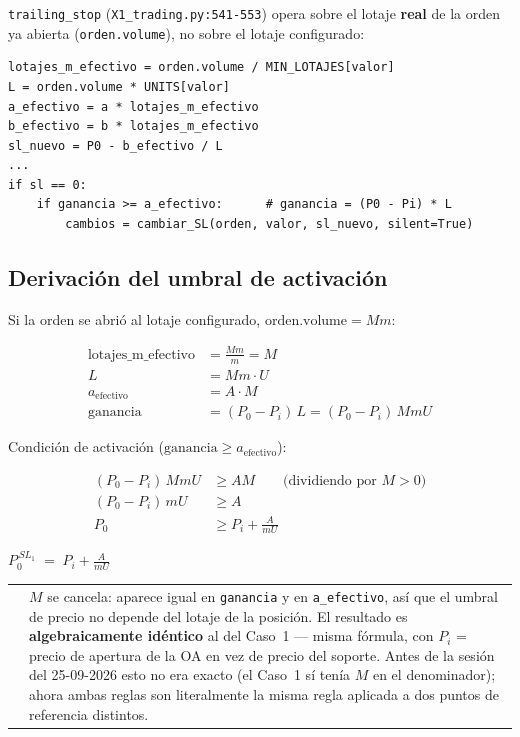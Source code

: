 \documentclass[11pt,a4paper]{article}
\makeatletter
\newcommand{\code}[1]{\texttt{\small #1}}
\newenvironment{nota}{%
  \par\medskip\noindent
  \begin{tabular}{@{}p{0.4em}@{\hspace{8pt}}p{\dimexpr\linewidth-2em\relax}@{}}
  \textcolor{cnaranja}{\rule{3pt}{1.1em}} &
}{\end{tabular}\par\medskip}
\makeatother
\begin{document}
\code{trailing\_stop} (\code{X1\_trading.py:541-553}) opera sobre el lotaje
\textbf{real} de la orden ya abierta (\code{orden.volume}), no sobre el lotaje
configurado:

\begin{lstlisting}
lotajes_m_efectivo = orden.volume / MIN_LOTAJES[valor]
L = orden.volume * UNITS[valor]
a_efectivo = a * lotajes_m_efectivo
b_efectivo = b * lotajes_m_efectivo
sl_nuevo = P0 - b_efectivo / L
...
if sl == 0:
    if ganancia >= a_efectivo:      # ganancia = (P0 - Pi) * L
        cambios = cambiar_SL(orden, valor, sl_nuevo, silent=True)
\end{lstlisting}

\subsection{Derivación del umbral de activación}

Si la orden se abrió al lotaje configurado, $\text{orden.volume} = Mm$:

\begin{align}
\text{lotajes\_m\_efectivo} &= \frac{Mm}{m} = M \\
L &= Mm \cdot U \\
a_{\text{efectivo}} &= A \cdot M \\
\text{ganancia} &= (P_0 - P_i)\, L = (P_0 - P_i)\, M m U
\end{align}

Condición de activación ($\text{ganancia} \geq a_{\text{efectivo}}$):

\begin{align}
(P_0 - P_i)\, M m U &\geq A M \qquad \text{(dividiendo por } M>0 \text{)} \\
(P_0 - P_i)\, m U &\geq A \\
P_0 &\geq P_i + \frac{A}{mU}
\end{align}

\begin{center}
\colorbox{cfondo}{$\displaystyle P_{0}^{\,SL_1} \;=\; P_i + \frac{A}{mU}$}
\end{center}

\begin{nota}
$M$ se cancela: aparece igual en \code{ganancia} y en \code{a\_efectivo}, así que el
umbral de precio no depende del lotaje de la posición. El resultado es
\textbf{algebraicamente idéntico} al del Caso~1 — misma fórmula, con $P_i$ = precio de
apertura de la OA en vez de precio del soporte. Antes de la sesión del 25-09-2026 esto
no era exacto (el Caso~1 sí tenía $M$ en el denominador); ahora ambas reglas son
literalmente la misma regla aplicada a dos puntos de referencia distintos.
\end{nota}
\end{document}
